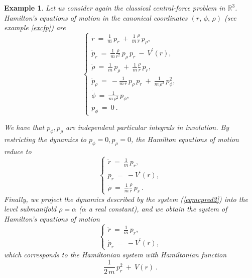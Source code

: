 \documentclass[10pt,a4paper]{article}
\newtheorem{example}{Example}
\begin{document}
\begin{example}
Let us consider again the classical central-force problem in $\mathbb{R}^3$. Hamilton's equations of motion in the canonical coordinates $(r,\,\phi,\,\rho)$ (see example \ref{excfp}) are
\begin{equation*}
\label{eqmcp}
\left\lbrace \begin{array}{c}
 {\dot r}  \ = \ \frac{1}{m}\,p_r \ + \ \frac{1}{m}\frac{\rho}{r}\,p_\rho ,
\\ 
 {\dot p}_r \ = \ \frac{1}{m}\frac{\rho}{r^2}\, p_{\rho}\, p_{r} \ - \ V^\prime(r),
  \\ 
 {\dot \rho}  \ = \ \frac{1}{m}\,p_\rho \ + \ \frac{1}{m}\frac{\rho}{r}\,p_r,
 \\ 
 {\dot p}_\rho \ = \ -\frac{1}{m\,r}\, p_{\rho}\, p_{r} \ + \ \frac{1}{m\,\rho^3}\,p_\phi^2 ,
 \\ 
 {\dot \phi}  \ = \ \frac{1}{m\,\rho^2}\,p_\phi,
 \\ 
 {\dot p}_\phi  \ = \ 0 \ .
\end{array} \right.
\end{equation*}

We have that $p_{\phi},p_{\rho}$ are independent particular integrals in involution. By restricting the dynamics to $p_{\phi}=0,p_{\rho}=0$, the Hamilton equations of motion reduce to
\begin{equation}
\left\lbrace \begin{array}{c}
\label{eqmcpred2}
 {\dot r}  \ = \ \frac{1}{m}\,p_r,
\\ 
 {\dot p}_r \ = \  -  V^\prime(r),
  \\ 
 {\dot \rho}  \ = \  \frac{1}{m}\frac{\rho}{r}\,p_r\ .
\end{array} \right.  
\end{equation}
Finally, we project the dynamics described by the system (\ref{eqmcpred2}) into the level submanifold $\rho=\alpha$ ($\alpha$ a real constant), and we obtain the system of Hamilton's equations of motion
\begin{equation*}
\left\lbrace \begin{array}{c}
 {\dot r}  \ = \ \frac{1}{m}\,p_r,
\\ 
 {\dot p}_r \ = \  -  V^\prime(r),
\end{array} \right.  
\end{equation*}
which corresponds to the Hamiltonian system with Hamiltonian function
\begin{equation*}
\frac{1}{2\,m}\, p_{r}^2  \ + \ V(r) \ .
\end{equation*} 
\end{example}
\end{document}
